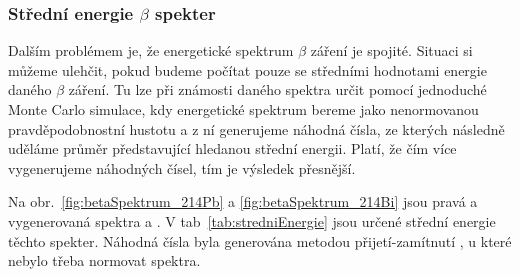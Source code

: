 \documentclass[11pt,a4paper]{article}
\begin{document}
\subsubsection{Střední energie $\beta$ spekter}
Dalším problémem je, že energetické spektrum $\beta$ záření je spojité. Situaci si můžeme ulehčit, pokud budeme počítat pouze se středními hodnotami energie daného $\beta$ záření. Tu lze při známosti daného spektra určit pomocí jednoduché Monte Carlo simulace, kdy energetické spektrum bereme jako nenormovanou pravděpodobnostní hustotu a z ní generujeme náhodná čísla, ze kterých následně uděláme průměr představující hledanou střední energii. Platí, že čím více vygenerujeme náhodných čísel, tím je výsledek přesnější.

Na obr.~\ref{fig:betaSpektrum_214Pb} a \ref{fig:betaSpektrum_214Bi} jsou pravá a vygenerovaná spektra  a . V tab~\ref{tab:stredniEnergie} jsou určené střední energie těchto spekter. Náhodná čísla byla generována metodou přijetí-zamítnutí \cite{rejection}, u které nebylo třeba normovat spektra.
\end{document}
